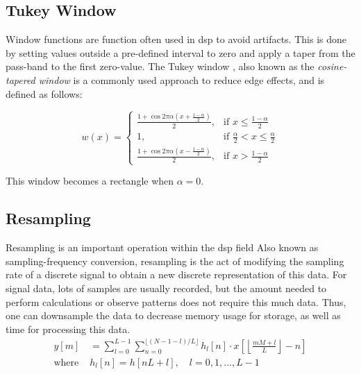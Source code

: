 \subsection{Tukey Window}
\label{dsp:tukey}

Window functions are function often used in \acrshort{dsp} to avoid artifacts. This is done by setting values outside a pre-defined interval to zero and apply a taper from the pass-band to the first zero-value. The Tukey window \cite{tukey1967introduction}, also known as the \textit{cosine-tapered window} is a commonly used approach to reduce edge effects, and is defined as follows:

\[
    w(x)= 
\begin{cases}
    \frac{1 + \cos{2 \pi \alpha (x + \frac{1-\alpha}{2})}}{2}, & \text{if } x \leq \frac{1-\alpha}{2}\\
    1,              & \text{if } \frac{\alpha}{2} < x \leq \frac{\alpha}{2}\\
    \frac{1 + \cos{2 \pi \alpha (x - \frac{1-\alpha}{2})}}{2}, & \text{if } x > \frac{1-\alpha}{2}
\end{cases}
\]

This window becomes a rectangle when $\alpha = 0$.


\subsection{Resampling}

Resampling is an important operation within the \acrshort{dsp} field
Also known as sampling-frequency conversion, resampling is the act of modifying the sampling rate of a discrete signal to obtain a new discrete representation of this data. For signal data, lots of samples are usually recorded, but the amount needed to perform calculations or observe patterns does not require this much data. Thus, one can downsample the data to decrease memory usage for storage, as well as time for processing this data. \\

\begin{equation}
\begin{aligned}
y[m] &= \sum_{l=0}^{L-1} \sum_{n=0}^{\lfloor(N-1-l)/L\rfloor} h_l[n] \cdot x\left[\left\lfloor\frac{mM+l}{L}\right\rfloor - n\right] \\[10pt]
\text{where } &h_l[n] = h[nL + l], \quad l = 0, 1, \ldots, L-1
\end{aligned}
\label{eq:resample}
\end{equation}

